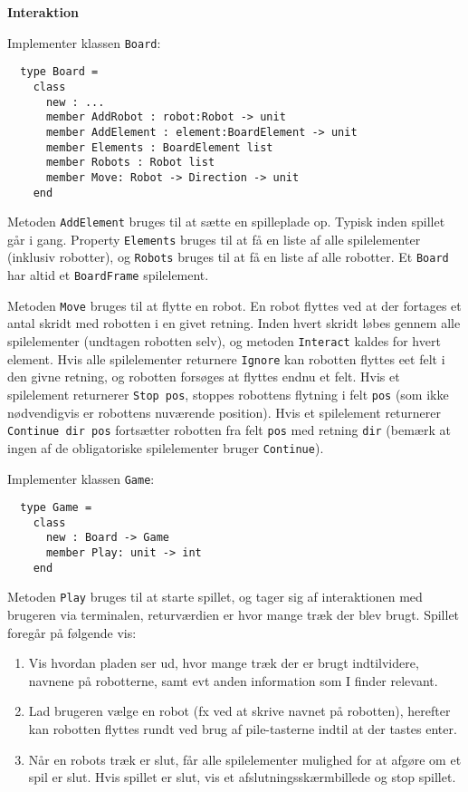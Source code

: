 \textbf{Interaktion}

Implementer klassen \lstinline{Board}:

\begin{lstlisting}
  type Board =
    class
      new : ...
      member AddRobot : robot:Robot -> unit
      member AddElement : element:BoardElement -> unit
      member Elements : BoardElement list
      member Robots : Robot list
      member Move: Robot -> Direction -> unit
    end
\end{lstlisting}

Metoden \lstinline{AddElement} bruges til at sætte en spilleplade
op. Typisk inden spillet går i gang. Property \lstinline{Elements}
bruges til at få en liste af alle spilelementer (inklusiv robotter),
og \lstinline{Robots} bruges til at få en liste af alle robotter. Et
\lstinline{Board} har altid et \lstinline{BoardFrame} spilelement.

Metoden \lstinline{Move} bruges til at flytte en robot. En
robot flyttes ved at der fortages et antal skridt med robotten i en
givet retning. Inden hvert skridt løbes gennem alle spilelementer (undtagen
robotten selv), og metoden \lstinline{Interact} kaldes for hvert
element. Hvis alle spilelementer returnere \lstinline{Ignore} kan
robotten flyttes eet felt i den givne retning, og robotten forsøges at
flyttes endnu et felt. Hvis et spilelement returnerer \lstinline{Stop pos},
stoppes robottens flytning i felt \lstinline{pos} (som ikke
nødvendigvis er robottens nuværende position). Hvis et spilelement
returnerer \lstinline{Continue dir pos} fortsætter robotten fra felt
\lstinline{pos} med retning \lstinline{dir} (bemærk at ingen af de
obligatoriske spilelementer bruger \lstinline{Continue}).


Implementer klassen \lstinline{Game}:

\begin{lstlisting}
  type Game =
    class
      new : Board -> Game
      member Play: unit -> int
    end
\end{lstlisting}

Metoden \lstinline{Play} bruges til at starte spillet, og tager sig af
interaktionen med brugeren via terminalen, returværdien er hvor mange
træk der blev brugt. Spillet
foregår på følgende vis:
\begin{enumerate}
 \item Vis hvordan pladen ser ud, hvor mange træk der er brugt
  indtilvidere, navnene på robotterne, samt evt anden information som
  I finder relevant.
\item Lad brugeren vælge en robot (fx ved at skrive navnet på
  robotten), herefter kan robotten flyttes rundt ved brug af
  pile-tasterne indtil at der tastes enter.

\item Når en robots træk er slut, får alle spilelementer mulighed for at
  afgøre om et spil er slut. Hvis spillet er slut, vis et
  afslutningsskærmbillede og stop spillet.
\end{enumerate}

